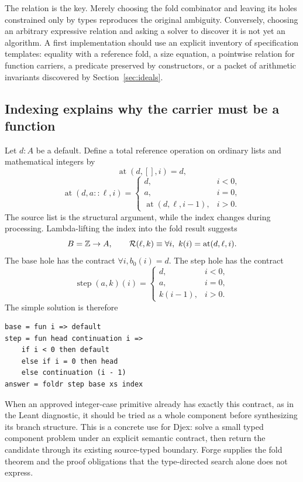 The relation is the key. Merely choosing the fold combinator and leaving its
holes constrained only by types reproduces the original ambiguity. Conversely,
choosing an arbitrary expressive relation and asking a solver to discover it is
not yet an algorithm. A first implementation should use an explicit inventory
of specification templates: equality with a reference fold, a size equation, a
pointwise relation for function carriers, a predicate preserved by constructors,
or a packet of arithmetic invariants discovered by Section~\ref{sec:ideals}.

\subsection{Indexing explains why the carrier must be a function}
Let $d:A$ be a default. Define a total reference operation on ordinary lists and
mathematical integers by
\[
 \operatorname{at}(d,[],i)=d,
\]
\[
 \operatorname{at}(d,a::\ell,i)=
 \begin{cases}
 d,&i<0,\\
 a,&i=0,\\
 \operatorname{at}(d,\ell,i-1),&i>0.
 \end{cases}
\]
The source list is the structural argument, while the index changes during
processing. Lambda-lifting the index into the fold result suggests
\[
 B=\mathbb{Z}\to A,
 \qquad \mathcal R(\ell,k)\equiv
       \forall i,\ k(i)=\operatorname{at}(d,\ell,i).
\]
The base hole has the contract $\forall i,b_0(i)=d$. The step hole has the
contract
\begin{equation}
\label{eq:index-contract}
 \operatorname{step}(a,k)(i)=
 \begin{cases}
 d,&i<0,\\
 a,&i=0,\\
 k(i-1),&i>0.
 \end{cases}
\end{equation}
The simple solution is therefore
\begin{lstlisting}
base = fun i => default
step = fun head continuation i =>
    if i < 0 then default
    else if i = 0 then head
    else continuation (i - 1)
answer = foldr step base xs index
\end{lstlisting}

When an approved integer-case primitive already has exactly this contract, as in
the Leant diagnostic, it should be tried as a whole component before synthesizing
its branch structure. This is a concrete use for Djex: solve a small typed
component problem under an explicit semantic contract, then return the candidate
through its existing source-typed boundary. Forge supplies the fold theorem and
the proof obligations that the type-directed search alone does not express.

